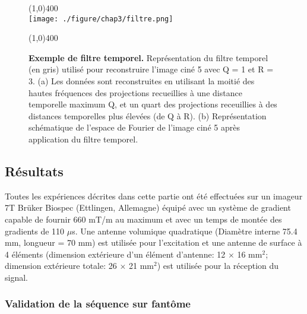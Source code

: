 \begin{figure}[H]
\centering \line(1,0){400} \\
\texttt{[image: ./figure/chap3/filtre.png]}
\caption[Exemple de filtre temporel.]{\label{fig:filtre} \textbf{Exemple de filtre temporel.} Représentation du filtre temporel (en gris) utilisé pour reconstruire l'image ciné 5 avec Q = 1 et R = 3. (a) Les données sont reconstruites en utilisant la moitié des hautes fréquences des projections recueillies à une distance temporelle maximum Q, et un quart des projections receuillies à des distances temporelles plus élevées (de Q à R). (b) Représentation schématique de l'espace de Fourier de l'image ciné 5 après application du filtre temporel.}
\line(1,0){400} \\ \end{figure}

\subsection{Résultats}

Toutes les expériences décrites dans cette partie ont été effectuées sur un imageur 7T Brüker Biospec (Ettlingen, Allemagne) équipé avec un système de gradient capable de fournir 660 mT/m au maximum et avec un temps de montée des gradients de 110 $\mu$s.
Une antenne volumique quadratique (Diamètre interne 75.4 mm, longueur = 70 mm) est utilisée pour l'excitation et une antenne de surface à 4 éléments (dimension extérieure d'un élément d'antenne: 12 $\times$ 16 mm$ ^2$; dimension extérieure totale: 26 $\times$ 21 mm$ ^2$) est utilisée pour la réception du signal.

\subsubsection{Validation de la séquence sur fantôme}

